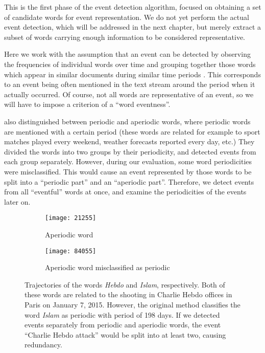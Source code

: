 This is the first phase of the event detection algorithm, focused on obtaining a set of candidate words for event representation. We do not yet perform the actual event detection, which will be addressed in the next chapter, but merely extract a subset of words carrying enough information to be considered representative.

Here we work with the assumption that an event can be detected by observing the frequencies of individual words over time and grouping together those words which appear in similar documents during similar time periods \cite{event-detection, parameter-free}. This corresponds to an event being often mentioned in the text stream around the period when it actually occurred. Of course, not all words are representative of an event, so we will have to impose a criterion of a ``word eventness''.

\cite{event-detection} also distinguished between periodic and aperiodic words, where periodic words are mentioned with a certain period (these words are related for example to sport matches played every weekend, weather forecasts reported every day, etc.) They divided the words into two groups by their periodicity, and detected events from each group separately. However, during our evaluation, some word periodicities were misclassified. This would cause an event represented by those words to be split into a ``periodic part'' and an ``aperiodic part''. Therefore, we detect events from all ``eventful'' words at once, and examine the periodicities of the events later on.

\begin{figure}
\centering
\begin{subfigure}{.5\textwidth}
  \centering
  \texttt{[image: 21255]}  %
  \caption{Aperiodic word}
  \label{fig:hebdo}
\end{subfigure}%
\begin{subfigure}{.5\textwidth}
  \centering
  \texttt{[image: 84055]}  %
  \caption{Aperiodic word misclassified as periodic}
  \label{fig:islam}
\end{subfigure}
\caption{Trajectories of the words \textit{Hebdo} and \textit{Islam}, respectively. Both of these words are related to the shooting in Charlie Hebdo offices in Paris on January 7, 2015. However, the original method classifies the word \textit{Islam} as periodic with period of 198 days. If we detected events separately from periodic and aperiodic words, the event ``Charlie Hebdo attack'' would be split into at least two, causing redundancy.}
\end{figure}


